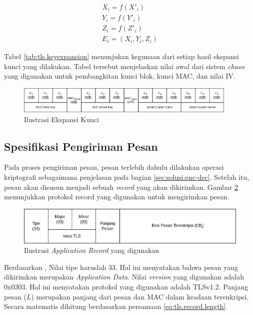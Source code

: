 \begin{equation}
  \begin{aligned}
    X_i = f(X'_i) \\
    Y_i = f(Y'_i) \\
    Z_i = f(Z'_i) \\
    E_i = (X_i, Y_i, Z_i)
  \end{aligned}
  \label{eq:tls.key.convert}
\end{equation}

Tabel \ref{tab:tls.keyexpansion} menunjukan kegunaan dari setiap hasil ekspansi kunci yang dilakukan. Tabel tersebut menjelaskan nilai awal dari sistem \emph{chaos} yang digunakan untuk pembangkitan kunci blok, kunci MAC, dan nilai IV.

\begin{figure}[!h]
  \centering
  \includegraphics[width=400px]{chapters/res/chapter-3/img/keyexpansion.png}
  \caption{Ilustrasi Ekspansi Kunci} \label{fig:tls.keyexpansion}
\end{figure}

\subsection{Spesifikasi Pengiriman Pesan}

Pada proses pengiriman pesan, pesan terlebih dahulu dilakukan operasi kriptografi sebagaimana penjelasan pada bagian \ref{sec:solusi.enc-dec}. Setelah itu, pesan akan disusun menjadi sebuah \emph{record} yang akan dikirimkan. Gambar \ref{fig:tls.application.rec} menunjukkan protokol record yang digunakan untuk mengirimkan pesan.

\begin{figure}[!h]
  \centering
  \includegraphics[width=\textwidth]{chapters/res/chapter-3/img/tls.application.record.png}
  \caption{Ilustrasi \emph{Application Record} yang digunakan} \label{fig:tls.application.rec}
\end{figure}

Berdasarkan \textcite{rfc5246}, Nilai tipe haruslah 33. Hal ini menyatakan bahwa pesan yang dikirimkan merupakan \emph{Application Data}. Nilai \emph{version} yang digunakan adalah $\text{0x0303}$. Hal ini menyatakan protokol yang digunakan adalah TLSv1.2. Panjang pesan ($L$) merupakan panjang dari pesan dan MAC dalam keadaan terenkripsi. Secara matematis dihitung berdasarkan persamaan \ref{eq:tls.record.length}.


